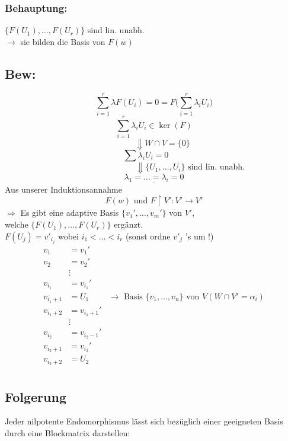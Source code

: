 \documentclass[titlepage,12pt,a4paper,ngerman]{report}
\newcommand{\tx}[1]{\textrm{#1}}
\begin{document}
\subsubsection{Behauptung:}
$ \{F(U_1), \dots , F(U_r) \} $ sind lin. unabh. \\
$ \rightarrow $ sie bilden die Basis von $ F(w) $

\subsection{Bew:}
$$ \sum_{i=1}^{r} \lambda F(U_i) = 0 = F\bigg(\sum_{i=1}^{r} \lambda_i U_i\bigg) $$
$$ \sum_{i=1}^{r} \lambda_i U_i \in \ker (F)$$
$$ \qquad \Downarrow W \cap V = \{0\}$$
$$ \sum \lambda_i U_i = 0 \qquad $$
$$ \qquad \qquad \qquad \qquad \quad  \Downarrow \{ U_1, \dots , U_i\} \tx{ sind lin. unabh. }$$
$$\underline{ \lambda_1 = \dots = \lambda_i = 0 } $$
Aus unserer Induktionsannahme
$$ F(w) \tx{ und } F \upharpoonright V': V' \to V'$$
$ \Rightarrow $ Es gibt eine adaptive Basis $ \{v_1',\dots , v_m'\} $ von $ V'$,\\ welche $ \{F(U_1), \dots , F(U_r) \} $ ergänzt.\\
$ F(U_j) = v' _{i_j} $ wobei $ i_1 < \dots < i_r $ (sonst ordne $ v'_j $ 's um !)
\begin{align*}
v_1 &= v_1' \\
v_2 &= v_2' \\
&\vdots \\
v_{i_1} &= v_{i_1}' \\
v_{i_1 +1} &= U_1 & \rightarrow \tx{ Basis } \{v_1,\dots,v_n\} \tx{ von } V (W\cap V' = {\alpha_i})\\
v_{i_1+2} &= v_{i_1+1}' \\
&\vdots \\
v_{i_2} &= v_{i_2 -1}' \\
v_{i_2+1} &= v_{i_2}' \\
v_{i_2+2} &= U_2 \\
\end{align*}

\subsection{Folgerung}
Jeder nilpotente Endomorphismus lässt sich bezüglich  einer geeigneten Basis durch eine Blockmatrix darstellen:
\end{document}
